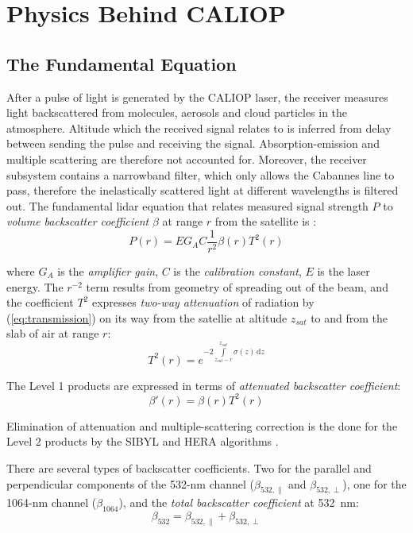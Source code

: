 \section{Physics Behind CALIOP}
\subsection{The Fundamental Equation}\label{sec:caliop-the-fundamental-equation}
After a pulse of light is generated by the CALIOP laser, the receiver measures light
backscattered from molecules, aerosols and cloud particles in the atmosphere. Altitude which the
received signal relates to is inferred from delay between sending the pulse
and receiving the signal. Absorption-emission and multiple scattering are
therefore not accounted for. Moreover, the receiver subsystem contains a
narrowband filter, which only allows the Cabannes line to pass, therefore the
inelastically scattered light at different wavelengths is filtered out.
The fundamental lidar equation that relates measured signal strength $P$ to
\textit{volume backscatter coefficient} $\beta$ at range $r$ from the satellite
is \citep{PC-SCI-201}:
\begin{equation}
P(r) = E G_A C \frac{1}{r^2} \beta(r) T^2(r)
\end{equation}

\noindent where $G_A$ is the \textit{amplifier gain}, $C$ is the
\textit{calibration constant}, $E$ is the laser energy. The
$r^{-2}$ term
results from geometry of spreading out of the beam, and the coefficient $T^2$
expresses \textit{two-way attenuation} of radiation by (\ref{eq:transmission}) on
its way from the satellie at altitude $z_{sat}$ to and from the slab of air at
range $r$:
\begin{equation}
T^2(r) = e^{-2 \int\limits_{z_{sat}-r}^{z_{sat}} \sigma(z) \, \mathrm{d}z}
\end{equation}

\noindent The Level 1 products are expressed in terms of \textit{attenuated backscatter coefficient}:
\begin{equation}\label{eq:attenuated-backscatter}
\beta'(r) = \beta(r) T^2(r)
\end{equation}

\noindent Elimination of attenuation and multiple-scattering correction is the done for the Level 2 products
by the SIBYL and HERA algorithms \citep{vaughana2004}.

There are several types of backscatter coefficients. Two for the parallel and perpendicular components of the 532-nm channel ($\beta_{532,\parallel}$ and $\beta_{532,\perp}$),
one for the 1064-nm channel ($\beta_{1064}$), and the \textit{total backscatter coefficient} at \SI{532}{nm}:
\begin{equation}
\beta_{532} = \beta_{532,\parallel} + \beta_{532,\perp}
\end{equation}

